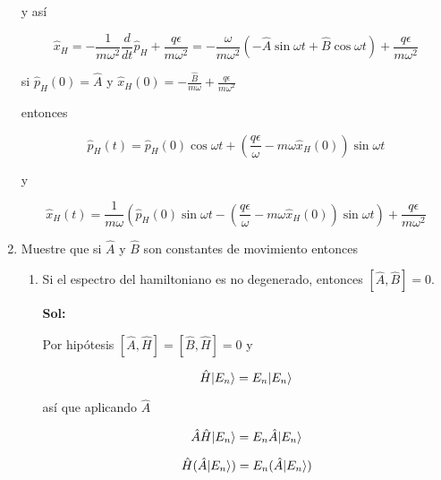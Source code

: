 \documentclass[12pt,a4paper]{article}
\DeclarePairedDelimiter\ket{\lvert}{\rangle}
\begin{document}
\begin{enumerate}
    y así
    
    \begin{equation*}
        \hat{x}_{H}= - \frac{1}{m \omega^2} \frac{d}{dt} \hat{p}_{H} + \frac{q \epsilon}{m \omega^2} = -\frac{\omega}{m \omega^2}(- \hat{A} \sin{\omega t} + \hat{B} \cos{\omega t}) + \frac{q \epsilon}{m \omega^2}
    \end{equation*}
    
    si $\hat{p}_{H} (0) = \hat{A}$ y $\hat{x}_{H}(0) = - \frac{\hat{B}}{m \omega} + \frac{q \epsilon}{m \omega^2}$
    
    entonces
    
    \begin{equation*}
        \hat{p}_{H} (t) = \hat{p}_{H}(0) \cos{\omega t} + (\frac{q \epsilon}{\omega}- m \omega \hat{x}_{H}(0)) \sin{\omega t}
    \end{equation*}
    
    y 
    
    \begin{equation*}
        \hat{x}_{H}(t) = \frac{1}{m \omega} (\hat{p}_{H} (0) \sin{\omega t} - (\frac{q\epsilon}{\omega}-m \omega \hat{x}_{H}(0)) \sin{\omega t}) + \frac{q \epsilon}{m \omega^2}
    \end{equation*}






\item Muestre que si $\hat{A}$ y $\hat{B}$ son constantes de movimiento entonces

\begin{enumerate}
    \item Si el espectro del hamiltoniano es no degenerado, entonces $[\hat{A}, \hat{B}]= 0$.
    
    \textbf{Sol:}
    
    Por hipótesis $[\hat{A}, \hat{H}] = [\hat{B},\hat{H}] = 0$ y
    
    \begin{equation*}
        \hat{H} \ket{E_n} = E_n \ket{E_n}
    \end{equation*}
    
    así que aplicando $\hat{A}$
    
    \begin{equation*}
        \hat{A} \hat{H} \ket{E_n} = E_n \hat{A} \ket{E_n}
    \end{equation*}
    
    \begin{equation*}
        \hat{H}(\hat{A}  \ket{E_n}) = E_n (\hat{A} \ket{E_n})
    \end{equation*}
    

\end{enumerate}
\end{enumerate}
\end{document}
